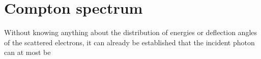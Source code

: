 
\section{Compton spectrum}
\label{sec:compton-spectrum}

Without knowing anything about the distribution of energies or
deflection angles of the scattered electrons, it can already be established that
the incident photon can at most be

